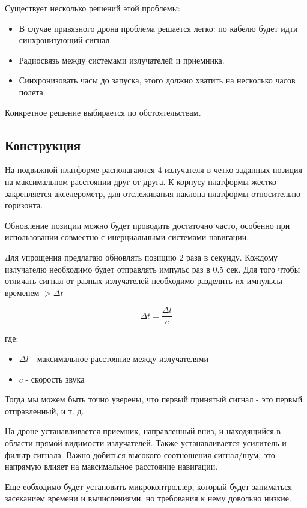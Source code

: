 \documentclass[a4paper,12pt]{article} %
\begin{document}
Существует несколько решений этой проблемы:

\begin{itemize}
  \item В случае привязного дрона проблема решается легко: по кабелю будет идти синхронизующий сигнал.
  \item Радиосвязь между системами излучателей и приемника.
  \item Синхронизовать часы до запуска, этого должно хватить на несколько часов полета.
\end{itemize}
Конкретное решение выбирается по обстоятельствам.

\subsection{Конструкция}
На подвижной платформе располагаются 4 излучателя в четко заданных позиция на максимальном расстоянии друг от друга. К корпусу платформы жестко закрепляется акселерометр, для отслеживания наклона платформы относительно горизонта.
\vspace{5mm}

Обновление позиции можно будет проводить достаточно часто, особенно при использовании совместно с инерциальными системами навигации.
\vspace{5mm}

Для упрощения предлагаю обновлять позицию 2 раза в секунду.
Кождому излучателю необходимо будет отправлять импульс раз в 0.5 сек. Для того чтобы отличать сигнал от разных излучателей необходимо разделить их импульсы временем $> \Delta t$

\begin{equation}
 \Delta t = \frac{\Delta l}{c}
\end{equation}

где:
\begin{itemize}
    \item $\Delta l$ - максимальное расстояние между излучателями
    \item $c$ - скорость звука
\end{itemize}

Тогда мы можем быть точно уверены, что первый принятый сигнал - это первый отправленный, и т. д.

На дроне устанавливается приемник, направленный вниз, и находящийся в области прямой видимости излучателей. Также устанавливается усилитель и фильтр сигнала. Важно добиться высокого соотношения сигнал/шум, это напрямую влияет на максимальное расстояние навигации.

Еще еобходимо будет установить микроконтроллер, который будет заниматься засеканием времени и вычислениями, но требования к нему довольно низкие.

\cite{vishn2020}
\end{document}
